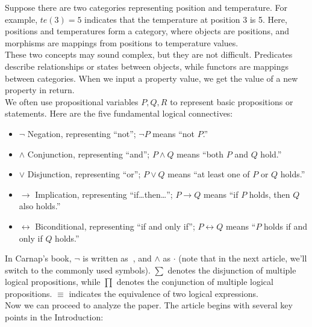 \documentclass[11p,oneside]{book}
\begin{document}
Suppose there are two categories representing position and temperature. For example, $te(3) = 5$ indicates that the temperature at position 3 is 5. Here, positions and temperatures form a category, where objects are positions, and morphisms are mappings from positions to temperature values.
\\

These two concepts may sound complex, but they are not difficult. Predicates describe relationships or states between objects, while functors are mappings between categories. When we input a property value, we get the value of a new property in return.
\\

We often use propositional variables $P, Q, R$ to represent basic propositions or statements. Here are the five fundamental logical connectives:

\begin{itemize}
    \item $\lnot$ Negation, representing “not”; $\lnot P$ means “not $P$.”
    \item $\land$ Conjunction, representing “and”; $P \land Q$ means “both $P$ and $Q$ hold.”
    \item $\lor$ Disjunction, representing “or”; $P \lor Q$ means “at least one of $P$ or $Q$ holds.”
    \item $\rightarrow$ Implication, representing “if…then…”; $P \rightarrow Q$ means “if $P$ holds, then $Q$ also holds.”
    \item $\leftrightarrow$ Biconditional, representing “if and only if”; $P \leftrightarrow Q$ means “$P$ holds if and only if $Q$ holds.”
\end{itemize}

In Carnap’s book, $\lnot$ is written as $~$, and $\land$ as $\cdot$ (note that in the next article, we’ll switch to the commonly used symbols). $\sum$ denotes the disjunction of multiple logical propositions, while $\prod$ denotes the conjunction of multiple logical propositions. $\equiv$ indicates the equivalence of two logical expressions.
\\

Now we can proceed to analyze the paper. The article begins with several key points in the Introduction:
\end{document}
